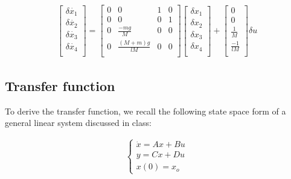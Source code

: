 \documentclass [12pt,letterpaper]{exam}
\begin{document}
\begin{align}
\begin{bmatrix}
\delta\dot{x_1} \\
\delta\dot{x_2} \\
\delta\dot{x_3} \\
\delta\dot{x_4} \\
\end{bmatrix}
=
\begin{bmatrix}
0 & 0 & 1 & 0 \\
0 & 0 & 0 & 1 \\
0 & \frac{-mg}{M} & 0 & 0 \\
0 & \frac{(M + m)g}{lM} & 0 & 0 \\
\end{bmatrix} 
\begin{bmatrix}
\delta x_1 \\
\delta x_2 \\
\delta x_3 \\
\delta x_4 \\
\end{bmatrix}
+
\begin{bmatrix}
0 \\
0 \\
\frac{1}{M} \\
\frac{-1}{lM} \\
\end{bmatrix} \delta u
\end{align}


\subsection{Transfer function}

To derive the transfer function, we recall the following state space form of a general linear system discussed in class:

\begin{align}
\begin{cases}
\dot{x} = Ax + Bu \\
y = Cx + Du \\
x(0) = x_o
\end{cases}
\end{align}
\end{document}
